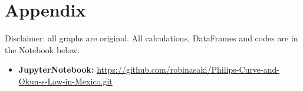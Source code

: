\documentclass{article}
\begin{document}
\section*{Appendix}

    {Disclaimer: all graphs are original. All calculations, DataFrames and codes are in the Notebook below.}

    \begin{itemize}
        \item{\textbf{JupyterNotebook: }\href{https://github.com/robinasaki/Philips-Curve-and-Okun-s-Law-in-Mexico.git}{https://github.com/robinasaki/Philips-Curve-and-Okun-s-Law-in-Mexico.git}}
    \end{itemize}

\end{document}
